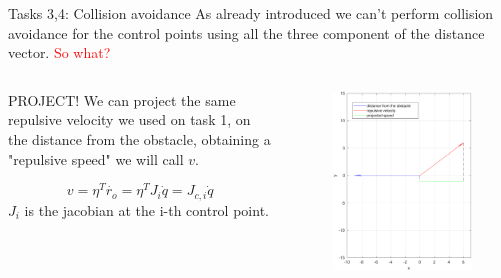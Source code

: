 \documentclass[11pt]{beamer}
\begin{document}
\begin{frame}{Tasks 3,4: Collision avoidance}
As already introduced we can't perform collision avoidance for the control points using all the three component of the distance vector. \textcolor{red}{So what?}
\begin{columns}
\begin{column}{.5\textwidth}
\begin{block}{PROJECT!}
We can project the same repulsive velocity we used on task 1, on the distance from the obstacle, obtaining a "repulsive speed" we will call $v$.
\end{block}
\begin{equation*}
v = \eta^T\dot{r_{o}} = \eta^T J_i\dot{q} = J_{c,i}\dot{q}
\end{equation*}
$J_i$ is the jacobian at the i-th control point.
\end{column}
\begin{column}{.5\textwidth}
			\begin{figure}[H]
				\includegraphics[width = .7\textwidth]{images/repulsive_velocity_vectorial.pdf}
			\end{figure}
		\end{column}
\end{columns}
\end{frame}
\end{document}
